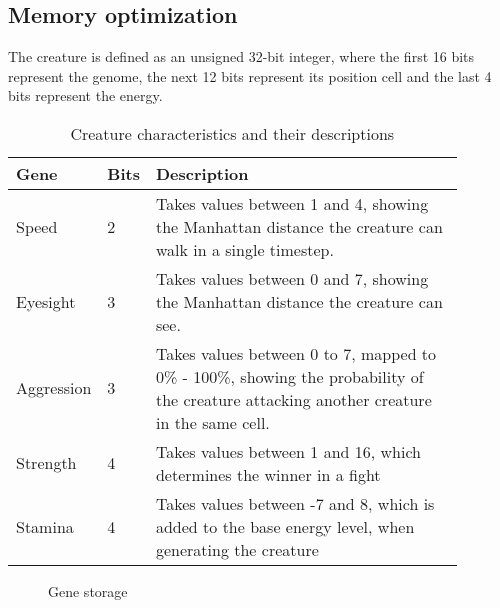 \documentclass{report}
\begin{document}
\subsection{Memory optimization}
The creature is defined as an unsigned 32-bit integer, where the first 16 bits represent the genome, the next 12 bits represent its position cell and the last 4 bits represent the energy.
\begin{table}[H]
\begin{center}
    \begin{tabular}{|p{0.11\linewidth} |p{0.08\linewidth}|p{0.7\linewidth}|}
    \hline
    Gene & Bits & Description  \\\hline
    Speed & 2 & Takes values between 1 and 4, showing the Manhattan distance the creature can walk in a single timestep.\\\hline
    Eyesight & 3 & Takes values between 0 and 7, showing the Manhattan distance the creature can see.\\\hline
    Aggression & 3 & Takes values between 0 to 7, mapped to 0\% - 100\%, showing the probability of the creature attacking another creature in the same cell. \\\hline
    Strength & 4 & Takes values between 1 and 16, which determines the winner in a fight \\\hline
    Stamina & 4 & Takes values between -7 and 8, which is added to the base energy level, when generating the creature\\\hline
\end{tabular}
\caption{Creature characteristics and their descriptions}
\end{center}
\end{table}
\begin{figure}[!h]
\begin{center}
\caption{Gene storage}
\end{center}
\end{figure}
\end{document}

